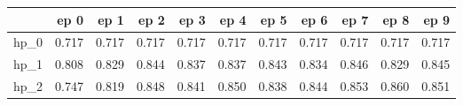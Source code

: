 \begin{tabular}{lrrrrrrrrrr}
\toprule
{} &   ep 0 &   ep 1 &   ep 2 &   ep 3 &   ep 4 &   ep 5 &   ep 6 &   ep 7 &   ep 8 &   ep 9 \\
\midrule
hp\_0 &  0.717 &  0.717 &  0.717 &  0.717 &  0.717 &  0.717 &  0.717 &  0.717 &  0.717 &  0.717 \\
hp\_1 &  0.808 &  0.829 &  0.844 &  0.837 &  0.837 &  0.843 &  0.834 &  0.846 &  0.829 &  0.845 \\
hp\_2 &  0.747 &  0.819 &  0.848 &  0.841 &  0.850 &  0.838 &  0.844 &  0.853 &  0.860 &  0.851 \\
\bottomrule
\end{tabular}
